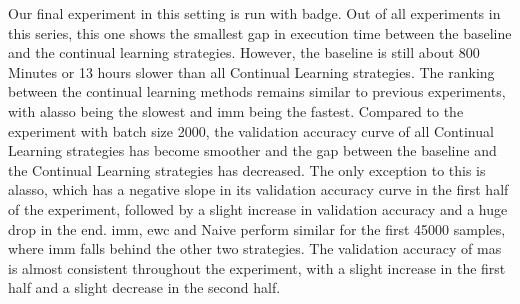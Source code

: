 Our final experiment in this setting is run with \gls{badge}. Out of all experiments in this series, this one shows the
smallest gap in execution time between the baseline and the continual learning strategies. However, the baseline is still about 800 Minutes or 13 hours slower than all Continual Learning strategies. 
The ranking between the continual learning methods remains similar to previous experiments, with \gls{alasso} being the slowest and \gls{imm} being the fastest. Compared to the experiment with batch size 2000,
the validation accuracy curve of all Continual Learning strategies has become smoother and the gap between the baseline and the Continual Learning strategies has decreased. The only exception to this is \gls{alasso},
which has a negative slope in its validation accuracy curve in the first half of the experiment, followed by a slight increase in validation accuracy and a huge drop in the end. \gls{imm}, \gls{ewc} and Naive perform
similar for the first 45000 samples, where \gls{imm} falls behind the other two strategies. The validation accuracy of \gls{mas} is almost consistent throughout the experiment, with a slight
increase in the first half and a slight decrease in the second half. \par


